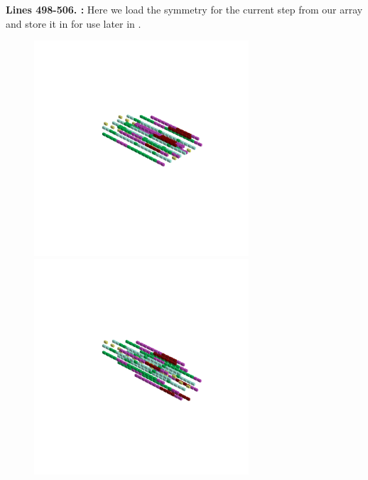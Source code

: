 \textbf{Lines 498-506. :} Here we load the symmetry for the current step from our array and store it in
 for use later in .

\clearpage
\hspace{-1cm}
\begin{minipage}[b]{0.50\linewidth}                                       
  \begin{figure}[H]
      \centering
        \vspace*{-1cm}
        \hspace*{-2cm}
        \includegraphics[width=8cm]{src/symmetries/pattern10_1-45.png}%
        \hspace*{-4cm}
        \includegraphics[width=8cm]{src/symmetries/pattern10_2-45.png}\\
        \vspace*{-5cm}
        \hspace*{-3cm}

\end{figure}
\end{minipage}
